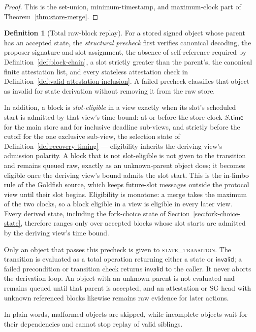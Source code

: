 \ifx\litemode\undefined\documentclass{article}\fi
\theoremstyle{plain}
\theoremstyle{definition}
\newtheorem{definition}{Definition}
\theoremstyle{remark}
\begin{document}
\begin{proof}
This is the set-union, minimum-timestamp, and maximum-clock part of
Theorem~\ref{thm:store-merge}.
\end{proof}

\begin{definition}[Total raw-block replay]\label{def:total-raw-replay}
For a stored signed object whose parent has an accepted state, the
\emph{structural precheck} first verifies canonical decoding, the proposer
signature and slot assignment, the absence of self-reference required by
Definition~\ref{def:block-chain}, a slot strictly greater than the
parent's,
the canonical finite attestation list, and every stateless attestation check
in Definition~\ref{def:valid-attestation-inclusion}.  A failed precheck
classifies that object as invalid for state derivation without removing it
from the raw store.

In addition, a block is \emph{slot-eligible} in a view exactly when
its slot's scheduled start is admitted by that view's time bound:
at or before the store clock \(S.\mathsf{time}\) for the main store
and for inclusive deadline sub-views, and strictly before the cutoff
for the one exclusive sub-view, the selection state of
Definition~\ref{def:recovery-timing} --- eligibility inherits the
deriving view's admission polarity.  A block that is not slot-eligible is not given to
the transition and remains queued raw, exactly as an unknown-parent
object does; it becomes eligible once the deriving view's bound admits
the slot start.  This
is the in-limbo rule of the Goldfish source, which keeps future-slot
messages outside the protocol view until their slot begins.  Eligibility
is monotone: a merge takes the maximum of the two clocks, so a block
eligible in a view is eligible in every later view.  Every derived
state, including the fork-choice state of
Section~\ref{sec:fork-choice-state}, therefore ranges only over
accepted blocks whose slot starts are admitted by the deriving view's
time bound.

Only an object that passes this precheck is given to
\textsc{state\_transition}.  The transition is evaluated as a total
operation returning either a state or \(\mathsf{invalid}\); a failed
precondition or transition check returns \(\mathsf{invalid}\) to the caller.
It never aborts the derivation loop.  An object with an unknown parent is not
evaluated and remains queued until that parent is accepted, and an
attestation or SG head with unknown referenced blocks likewise remains raw
evidence for later actions.

In plain words, malformed objects are skipped, while incomplete objects wait
for their dependencies and cannot stop replay of valid siblings.
\end{definition}
\end{document}

